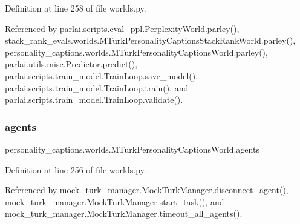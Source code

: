 Definition at line 258 of file worlds.\+py.



Referenced by parlai.\+scripts.\+eval\+\_\+ppl.\+Perplexity\+World.\+parley(), stack\+\_\+rank\+\_\+evals.\+worlds.\+M\+Turk\+Personality\+Captions\+Stack\+Rank\+World.\+parley(), personality\+\_\+captions.\+worlds.\+M\+Turk\+Personality\+Captions\+World.\+parley(), parlai.\+utils.\+misc.\+Predictor.\+predict(), parlai.\+scripts.\+train\+\_\+model.\+Train\+Loop.\+save\+\_\+model(), parlai.\+scripts.\+train\+\_\+model.\+Train\+Loop.\+train(), and parlai.\+scripts.\+train\+\_\+model.\+Train\+Loop.\+validate().

\mbox{\label{classpersonality__captions_1_1worlds_1_1MTurkPersonalityCaptionsWorld_aab94355fe6accd2935a78f0e1836eb6c}} 
\subsubsection{\texorpdfstring{agents}{agents}}
{\footnotesize\ttfamily personality\+\_\+captions.\+worlds.\+M\+Turk\+Personality\+Captions\+World.\+agents}



Definition at line 256 of file worlds.\+py.



Referenced by mock\+\_\+turk\+\_\+manager.\+Mock\+Turk\+Manager.\+disconnect\+\_\+agent(), mock\+\_\+turk\+\_\+manager.\+Mock\+Turk\+Manager.\+start\+\_\+task(), and mock\+\_\+turk\+\_\+manager.\+Mock\+Turk\+Manager.\+timeout\+\_\+all\+\_\+agents().

\mbox{\label{classpersonality__captions_1_1worlds_1_1MTurkPersonalityCaptionsWorld_ae31a2275d8036447df796fcca3031263}} 

